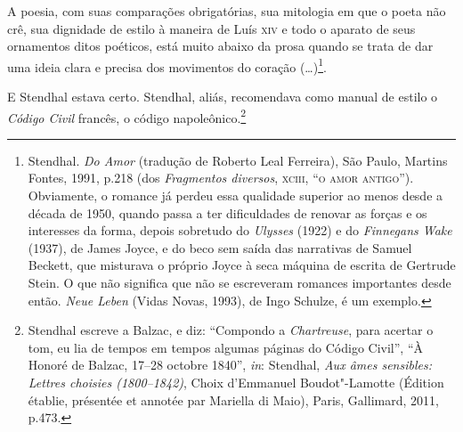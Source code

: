 A poesia, com suas comparações obrigatórias, sua mitologia em que o
poeta não crê, sua dignidade de estilo à maneira de Luís \textsc{xiv} e todo o
aparato de seus ornamentos ditos poéticos, está muito abaixo da prosa
quando se trata de dar uma ideia clara e precisa dos movimentos do
coração (\ldots{})\footnote{Stendhal. \emph{Do Amor} (tradução de Roberto
  Leal Ferreira), São Paulo, Martins Fontes, 1991, p.218 (dos
  \emph{Fragmentos diversos}, \textsc{xciii}, ``\textsc{o amor antigo}''). Obviamente, o
  romance já perdeu essa qualidade superior ao menos desde a década de
  1950, quando passa a ter dificuldades de renovar as forças e os
  interesses da forma, depois sobretudo do \emph{Ulysses} (1922) e do
  \emph{Finnegans Wake} (1937), de James Joyce, e do beco sem saída das
  narrativas de Samuel Beckett, que misturava o próprio Joyce à seca
  máquina de escrita de Gertrude Stein. O que não significa que não se
  escreveram romances importantes desde então. \emph{Neue Leben} (Vidas
  Novas, 1993), de Ingo Schulze, é um exemplo.}.

E Stendhal estava certo. Stendhal, aliás, recomendava como manual de
estilo o \emph{Código Civil} francês, o código napoleônico.\footnote{Stendhal
  escreve a Balzac, e diz: ``Compondo a \emph{Chartreuse}, para acertar
  o tom, eu lia de tempos em tempos algumas páginas do Código Civil'',
  ``À Honoré de Balzac, 17--28 octobre 1840'', \emph{in}: Stendhal,
  \emph{Aux âmes sensibles: Lettres choisies (1800--1842)}, Choix
  d'Emmanuel Boudot"-Lamotte (Édition établie, présentée et annotée par
  Mariella di Maio), Paris, Gallimard, 2011, p.473.}

